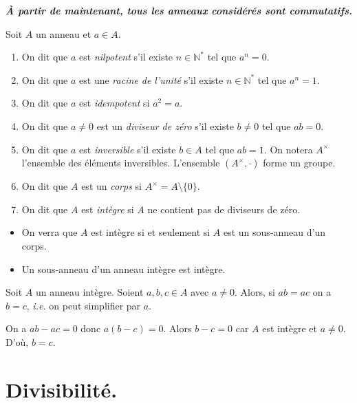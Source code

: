 \documentclass[./main]{subfiles}
\begin{document}
  \textbf{\textsl{À partir de maintenant, tous les anneaux considérés sont commutatifs.}}

  \begin{defn}
    Soit $A$ un anneau et $a \in A$.
    \begin{enumerate}
      \item On dit que $a$ est \textit{nilpotent} s'il existe $n \in \mathds{N}^*$ tel que $a^n = 0$.
      \item On dit que $a$ est une \textit{racine de l'unité} s'il existe $n \in \mathds{N}^*$ tel que $a^n = 1$.
      \item On dit que $a$ est \textit{idempotent} si $a^2 = a$.
      \item On dit que $a \neq 0$ est un \textit{diviseur de zéro} s'il existe $b \neq 0$ tel que $a b = 0$.
      \item On dit que $a$ est \textit{inversible} s'il existe $b \in A$ tel que $ab = 1$. On notera $A^\times$ l'ensemble des éléments inversibles. L'ensemble $(A^\times, \cdot)$ forme un groupe.
      \item On dit que $A$ est un \textit{corps} si $A^\times = A \setminus \{0\}$.
      \item On dit que $A$ est \textit{intègre} si $A$ ne contient pas de diviseurs de zéro.
    \end{enumerate}
  \end{defn}

  \begin{rmk}
    \begin{itemize}
      \item On verra que $A$ est intègre si et seulement si $A$ est un sous-anneau d'un corps.
      \item Un sous-anneau d'un anneau intègre est intègre.
    \end{itemize}
  \end{rmk}

  \begin{lem}
    Soit $A$ un anneau intègre. Soient $a, b, c \in A$ avec $a \neq 0$. Alors, si $a b = a c$ on a  $b = c$, \textit{i.e.} on peut simplifier par $a$.
  \end{lem}
  \begin{prv}
    On a $ab - ac = 0$ donc $a(b-c) = 0$. Alors $b -c = 0$ car $A$ est intègre et $a \neq 0$. D'où, $b = c$.
  \end{prv}

  \section{Divisibilité.}
\end{document}
